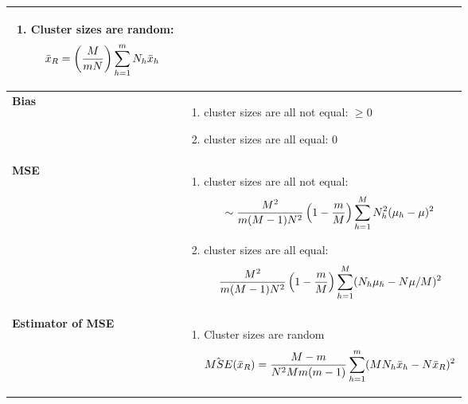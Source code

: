 \begin{longtable}{|p{5cm}|p{9cm}|}
\begin{minipage}{8cm}
\begin{enumerate}
            \item Cluster sizes are random:
            \[
                \bar{x}_R= \left( \dfrac{M}{mN} \right)
                \displaystyle\sum_{h=1}^{m} N_h\bar{x}_h
            \]
        \end{enumerate}
        \vspace{0.01cm}
    \end{minipage}
    \\[1ex]
    \hline

    \textbf{Bias} & \begin{minipage}{8cm}
        \begin{enumerate}
            \item cluster sizes are all not equal: $\geq 0$
            \item cluster sizes are all equal: $0$
        \end{enumerate}
        \vspace{0.1cm}
    \end{minipage}\\
    \hline

    \textbf{MSE} & \begin{minipage}{8cm}
        \vspace{0.2cm}
        \begin{enumerate}
            \item cluster sizes are all not equal:
            \[
                \sim\dfrac{M^2}{m(M-1)N^2}
                \left(1- \dfrac{m}{M} \right)
                \displaystyle\sum_{h=1}^{M}
                N_h^2(\mu_h - \mu)^2
            \]

            \item cluster sizes are all equal:
            \[
                \dfrac{M^2}{m(M-1)N^2}
                \left(1- \dfrac{m}{M} \right)
                \displaystyle\sum_{h=1}^{M}
                (N_h\mu_h - N\mu/M)^2
            \]
        \end{enumerate}
        \vspace{0.01cm}
    \end{minipage}\\
    \hline

    \textbf{Estimator of MSE} & \begin{minipage}{8cm}
        \vspace{0.2cm}
        \begin{enumerate}
            \item Cluster sizes are random
            \[
                \hat{MSE}(\bar{x}_R) =
                \dfrac{M-m}{N^2Mm(m-1)}
                \displaystyle\sum_{h=1}^{m}
                (MN_h\bar{x}_h - N\bar{x}_R)^2
            \]
        \end{enumerate}
        \vspace{0.1cm}
    \end{minipage}\\
    \hline


\end{longtable}
